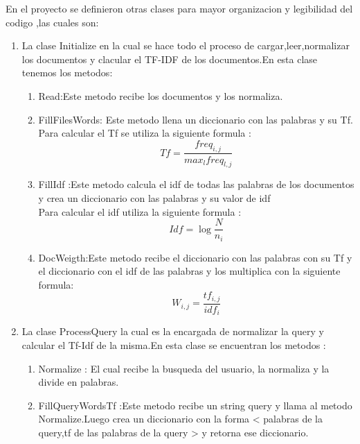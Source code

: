 \documentclass[12 pts,spanish]{article}
\begin{document}
En el proyecto se definieron otras clases para mayor organizacion y legibilidad del codigo ,las cuales son:
\begin{enumerate}
    \item La clase Initialize en la cual se hace todo el proceso de cargar,leer,normalizar los documentos y clacular el TF-IDF de los documentos.En esta clase tenemos los metodos:
    \begin{enumerate}
        \item Read:Este metodo recibe los documentos y los normaliza.
        \item FillFilesWords: Este metodo llena un diccionario con las palabras y su Tf.\\Para calcular el Tf se utiliza la siguiente formula :
        \begin{equation}
            Tf = \frac{freq_{i,j}}{max_{l}freq_{ l,j}}
        \end{equation}
        \item FillIdf :Este metodo calcula el idf de todas las palabras de los documentos y crea un diccionario con las palabras y su valor de idf \\Para calcular el idf utiliza la siguiente formula :
        \begin{equation}
            Idf=\log{\frac{N}{n_{i}}}
        \end{equation}

        \item DocWeigth:Este metodo recibe el diccionario con las palabras con su Tf y el diccionario con el idf de las palabras y los multiplica con la siguiente formula:
        \begin{equation}
            W_{i,j}=\frac{tf_{i,j}}{idf_{i}}
        \end{equation} 

    \end{enumerate}
    \item La clase ProcessQuery la cual es la encargada de normalizar la query y calcular el Tf-Idf de la misma.En esta clase se encuentran los metodos :
    \begin{enumerate}
        \item Normalize : El cual recibe la busqueda del usuario, la normaliza y la divide en palabras.
        
        \item FillQueryWordsTf :Este metodo recibe un string query y llama al metodo Normalize.Luego crea un  diccionario con la forma < palabras de la query,tf de las palabras de la query > y retorna ese diccionario.
        

\end{enumerate}
\end{enumerate}
\end{document}
